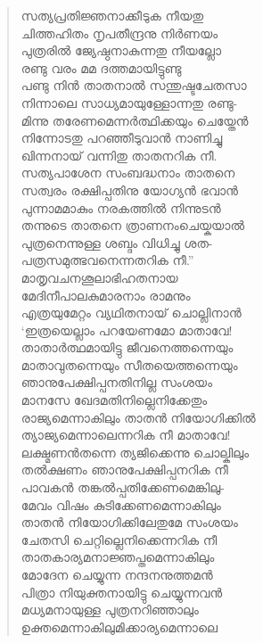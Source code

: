 \begin{verse}
സത്യപ്രതിജ്ഞനാക്കീടുക നീയതു\\
ചിത്തഹിതം നൃപതീന്ദ്രനു നിര്‍ണയം\\
പുത്രരില്‍ ജ്യേഷ്ഠനാകുന്നതു നീയല്ലോ\\
രണ്ടു വരം മമ ദത്തമായിട്ടുണ്ടു\\
പണ്ടു നിന്‍ താതനാല്‍ സന്തുഷ്ടചേതസാ\\
നിന്നാലെ സാധ്യമായുള്ളോന്നതു രണ്ടു-\\
മിന്നു തരേണമെന്നര്‍ത്ഥിക്കയും ചെയ്തേന്‍\\
നിന്നോടതു പറഞ്ഞീടുവാന്‍ നാണിച്ചു\\
ഖിന്നനായ് വന്നിതു താതനറിക നീ.\\
സത്യപാശേന സംബദ്ധനാം താതനെ\\
സത്വരം രക്ഷിപ്പതിനു യോഗ്യന്‍ ഭവാന്‍\\
പുന്നാമമാകും നരകത്തില്‍ നിന്നുടന്‍\\
തന്നുടെ താതനെ ത്രാണനംചെയ്കയാല്‍\\
പുത്രനെന്നുള്ള ശബ്ദം വിധിച്ചു ശത-\\
പത്രസമുത്ഭവനെന്നതറിക നീ.”\\
മാതൃവചനശൂലാഭിഹതനായ\\
മേദിനീപാലകുമാരനാം രാമനും\\
എത്രയുമേറ്റം വ്യഥിതനായ് ചൊല്ലിനാന്‍\\
‘ഇത്രയെല്ലാം പറയേണമോ മാതാവേ!\\
താതാര്‍ത്ഥമായിട്ടു ജീവനെത്തന്നെയും\\
മാതാവുതന്നെയും സീതയെത്തന്നെയും\\
ഞാനുപേക്ഷിപ്പനതിനില്ല സംശയം\\
മാനസേ ഖേദമതിനില്ലെനിക്കേതും\\
രാജ്യമെന്നാകിലും താതന്‍ നിയോഗിക്കില്‍\\
ത്യാജ്യമെന്നാലെന്നറിക നീ മാതാവേ!\\
ലക്ഷ്മണന്‍തന്നെ ത്യജിക്കെന്നു ചൊല്കിലും\\
തല്‍ക്ഷണം ഞാനുപേക്ഷിപ്പനറിക നീ\\
പാവകന്‍ തങ്കല്‍പ്പതിക്കേണമെങ്കിലു-\\
മേവം വിഷം കുടിക്കേണമെന്നാകിലും\\
താതന്‍ നിയോഗിക്കിലേതുമേ സംശയം\\
ചേതസി ചെറ്റില്ലെനിക്കെന്നറിക നീ\\
താതകാര്യമനാജ്ഞപ്തമെന്നാകിലും\\
മോദേന ചെയ്യുന്ന നന്ദനനുത്തമന്‍\\
പിത്രാ നിയുക്തനായിട്ടു ചെയ്യുന്നവന്‍\\
മധ്യമനായുള്ള പുത്രനറിഞ്ഞാലും\\
ഉക്തമെന്നാകിലുമിക്കാര്യമെന്നാലെ\\

\end{verse}
